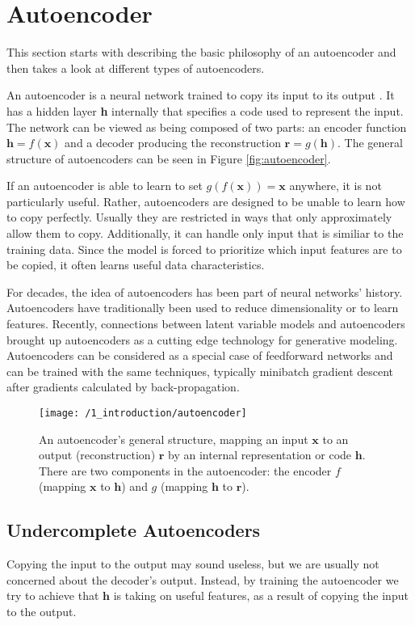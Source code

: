 \section{Autoencoder}\label{sec:autoencoder}
This section starts with describing the basic philosophy of an autoencoder and
then takes a look at different types of autoencoders.

An autoencoder is a neural network trained to copy its input to its output
\cite{Goodfellow-et-al-2016}. It has a hidden layer \textbf{h} internally that
specifies a code used to represent the input. The network can be viewed as being
composed of two parts: an encoder function $\textbf{h} = f(\textbf{x})$ and a
decoder producing the reconstruction $\textbf{r} = g(\textbf{h})$. The general
structure of autoencoders can be seen in Figure \ref{fig:autoencoder}.

If an autoencoder is able to learn to set $g(f(\textbf{x}))=\textbf{x}$
anywhere, it is not particularly useful. Rather, autoencoders are designed to be
unable to learn how to copy perfectly. Usually they are restricted in ways that
only approximately allow them to copy. Additionally, it can handle only input
that is similiar to the training data. Since the model is forced to prioritize
which input features are to be copied, it often learns useful data characteristics. 

For decades, the idea of autoencoders has been part of neural networks' history.
Autoencoders have traditionally been used to reduce dimensionality or to learn
features. Recently, connections between latent variable models and autoencoders
brought up autoencoders as a cutting edge technology for generative modeling.
Autoencoders can be considered as a special case of feedforward networks and can
be trained with the same techniques, typically minibatch gradient descent after
gradients calculated by back-propagation. 

\begin{figure}[h]
    \centering
    \texttt{[image: /1\_introduction/autoencoder]}
    \caption{An autoencoder's general structure, mapping an input $\textbf{x}$
    to an output (reconstruction) $\textbf{r}$ by an internal representation or
    code $\textbf{h}$. There are two components in the autoencoder: the encoder
    $f$ (mapping $\textbf{x}$ to $\textbf{h}$) and $g$ (mapping $\textbf{h}$ to
    $\textbf{r}$).}
\end{figure}


\subsection{Undercomplete Autoencoders}
Copying the input to the output may sound useless, but we are usually not
concerned about the decoder's output. Instead, by training the autoencoder we
try to achieve that $ \textbf{h}$ is taking on useful features, as a result of
copying the input to the output.

